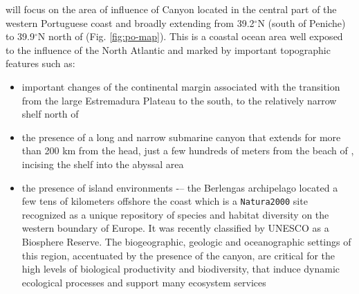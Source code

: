 \proj will focus on the area of influence of \naz Canyon located in
the central part of the western Portuguese coast and broadly extending
from 39.2$^{\circ}$N (south of Peniche) to 39.9$^{\circ}$N north of
\naz (Fig. \ref{fig:po-map}). This is a coastal ocean area well
exposed to the influence of the North Atlantic and marked by
important topographic features such as:

\begin{itemize}[noitemsep,topsep=0pt,parsep=0pt,partopsep=0pt]

\item important changes of the continental margin associated with the
  transition from the large Estremadura Plateau to the south, to the
  relatively narrow shelf north of \naz

\item the presence of a long and narrow submarine \naz canyon that
  extends for more than 200 km from the head, just a few hundreds of
  meters from the beach of \naze, incising the shelf into the abyssal
  area

\item the presence of island environments -– the Berlengas archipelago
  located a few tens of kilometers offshore the coast which is a
  \texttt{Natura2000} site recognized as a unique repository of
  species and habitat diversity on the western boundary of Europe. It
  was recently classified by UNESCO as a Biosphere Reserve. The
  biogeographic, geologic and oceanographic settings of this region,
  accentuated by the presence of the \naz canyon, are critical for the
  high levels of biological productivity and biodiversity, that induce
  dynamic ecological processes and support many ecosystem services

\end{itemize}


